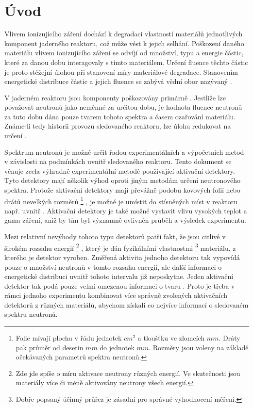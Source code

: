 \section{Úvod}
Vlivem ionizujícího záření dochází k degradaci vlastností materiálů jednotlivých komponent jaderného reaktoru, což může vést k jejich selhání. Poškození daného materiálu vlivem ionizujícího záření se odvíjí od množství, typu a energie částic, které za danou dobu interagovaly s tímto materiálem. Určení \gls{fluence} těchto částic je proto stěžejní úlohou při stanovení míry materiálové degradace. Stanovením energetické distribuce částic a jejich \gls{fluence} se zabývá vědní obor nazývaný .

V jaderném reaktoru jsou komponenty poškozovány primárně . Jestliže lze považovat  neutronů jako neměnné za určitou dobu, je hodnota \gls{fluence} neutronů za tuto dobu dána pouze tvarem tohoto spektra a časem ozařování materiálu. Známe-li tedy historii provozu sledovaného reaktoru, lze úlohu redukovat na určení .

Spektrum neutronů je možné určit řadou experimentálních a výpočetních metod v závislosti na podmínkách uvnitř sledovaného reaktoru. Tento dokument se věnuje zcela výhradně experimentální metodě používající aktivační detektory. Tyto detektory mají několik výhod oproti jiným metodám určení neutronového spektra. Protože aktivační detektory mají převážně podobu kovových folií nebo drátů nevelkých rozměrů%
\footnote{Folie mívají plochu v řádu jednotek $cm^2$ a tloušťku ve zlomcích $mm$. Dráty pak průměr od desetin $mm$ do jednotek $mm$. Rozměry jsou voleny na základě  očekávaných parametrů spektra neutronů.}
, je možné je umístit do stísněných míst v reaktoru např. uvnitř . Aktivační detektory je také možné vystavit vlivu vysokých teplot a gama záření, aniž by tím byl významně ovlivněn průběh a výsledek experimentu.

Mezi relativní nevýhody tohoto typu detektorů patří fakt, že jsou citlivé v širokém rozsahu energií%
\footnote{Zde jde spíše o míru aktivace neutrony různých energií. Ve skutečnosti jsou materiály více či méně aktivovány neutrony všech energií.}
, který je dán fyzikálními vlastnostmi%
\footnote{Dobře popsaný účinný průřez je zásadní pro správné vyhodnocení měření.}
materiálu, z kterého je detektor vyroben. Změřená aktivita jednoho detektoru tak vypovídá pouze o množství neutronů v tomto rozsahu energií, ale další informaci o energetické distribuci uvnitř tohoto intervalu již neposkytne.  Jeden aktivační detektor tak podá pouze velmi omezenou informaci o tvaru . Proto je třeba v rámci jednoho experimentu kombinovat více správně zvolených aktivačních detektorů z různých materiálů, abychom získali co nejvíce informací o sledovaném spektru neutronů.

